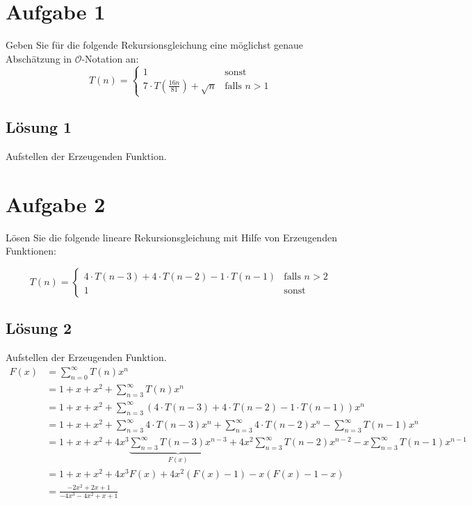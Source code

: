 \documentclass[main.tex]{subfiles}
\begin{document}
\section{Aufgabe 1}
Geben Sie für die folgende Rekursionsgleichung eine möglichst genaue Abschätzung in $\mathcal{O}$-Notation an:
\[
    T(n) = \begin{cases}
        1 & \text{sonst}\\
        7\cdot T\left(\frac{16n}{81}\right) + \sqrt{n} & \text{falls $n>1$}
    \end{cases}
\]

\subsection{Lösung 1}
Aufstellen der Erzeugenden Funktion.


\section{Aufgabe 2}
Lösen Sie die folgende lineare Rekursionsgleichung mit Hilfe von Erzeugenden Funktionen:

\[
    T(n) = \begin{cases}
        4\cdot T(n-3) + 4\cdot T(n-2) -1\cdot T(n-1) & \text{falls $n>2$} \\
        1 & \text{sonst}
    \end{cases}
\]

\subsection{Lösung 2}
Aufstellen der Erzeugenden Funktion.
\begin{align*}
    F(x) &= \sum_{n=0}^{\infty} T(n) x^n \\
    &= 1 + x + x^2 + \sum_{n=3}^{\infty} T(n) x^n \\
    &= 1 + x + x^2 + \sum_{n=3}^{\infty} \left( 4\cdot T(n-3) + 4\cdot T(n-2) -1\cdot T(n-1) \right) x^n \\ %
    &= %
    1 + x + x^2 
    + \sum_{n=3}^{\infty} 4\cdot T(n-3) x^n
    + \sum_{n=3}^{\infty} 4\cdot T(n-2) x^n
    - \sum_{n=3}^{\infty} T(n-1) x^n \\
    &= %
    1 + x + x^2 
    + 4x^3 \underbrace{\sum_{n=3}^{\infty} T(n-3) x^{n-3}}_{F(x)}
    + 4x^2 \sum_{n=3}^{\infty} T(n-2) x^{n-2}
    - x \sum_{n=3}^{\infty} T(n-1) x^{n-1} \\
    &= %
    1 + x + x^2 
    + 4x^3 F(x)
    + 4x^2 \left( F(x) -1 \right)
    - x \left( F(x) - 1 -x \right) \\
    &= %
    \frac{
        -2x^2 + 2x +1
    }{
        -4x^3 -4x^2 + x +1} \\
\end{align*}
\end{document}
